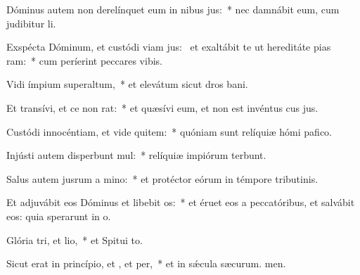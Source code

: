 \item Dóminus autem non derelínquet eum in nibus jus:~* nec damnábit eum, cum judibitur li.
\item Exspécta Dóminum, et custódi viam jus:~\pscross{} et exaltábit te ut hereditáte pias ram:~* cum períerint peccares vibis.
\item Vidi ímpium superaltum,~* et elevátum sicut dros bani.
\item Et transívi, et ce non rat:~* et quæsívi eum, et non est invéntus cus jus.
\item Custódi innocéntiam, et vide quitem:~* quóniam sunt relíquiæ hómi pafico.
\item Injústi autem disperbunt mul:~* relíquiæ impiórum terbunt.
\item Salus autem jusrum a mino:~* et protéctor eórum in témpore tributinis.
\item Et adjuvábit eos Dóminus et libebit os:~* et éruet eos a peccatóribus, et salvábit eos: quia sperarunt in o.
\item Glória tri, et lio,~* et Spitui to.
\item Sicut erat in princípio, et , et per,~* et in sǽcula sæcurum. men.
